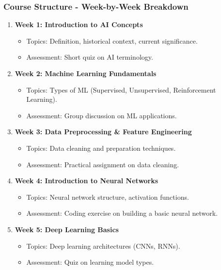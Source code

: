 \documentclass[aspectratio=169]{beamer}
\begin{document}
\begin{frame}[fragile]
    \frametitle{Course Structure - Week-by-Week Breakdown}
    \begin{enumerate}
        \item \textbf{Week 1: Introduction to AI Concepts}
            \begin{itemize}
                \item Topics: Definition, historical context, current significance.
                \item Assessment: Short quiz on AI terminology.
            \end{itemize}
        \item \textbf{Week 2: Machine Learning Fundamentals}
            \begin{itemize}
                \item Topics: Types of ML (Supervised, Unsupervised, Reinforcement Learning).
                \item Assessment: Group discussion on ML applications.
            \end{itemize}
        \item \textbf{Week 3: Data Preprocessing \& Feature Engineering}
            \begin{itemize}
                \item Topics: Data cleaning and preparation techniques.
                \item Assessment: Practical assignment on data cleaning.
            \end{itemize}
        \item \textbf{Week 4: Introduction to Neural Networks}
            \begin{itemize}
                \item Topics: Neural network structure, activation functions.
                \item Assessment: Coding exercise on building a basic neural network.
            \end{itemize}
        \item \textbf{Week 5: Deep Learning Basics}
            \begin{itemize}
                \item Topics: Deep learning architectures (CNNs, RNNs).
                \item Assessment: Quiz on learning model types.
            \end{itemize}
    \end{enumerate}
\end{frame}
\end{document}
